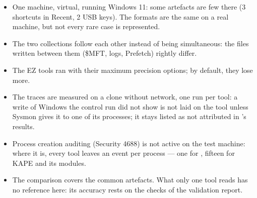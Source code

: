 \documentclass[11pt,a4paper,oneside]{report}
\begin{document}
\begin{itemize}
  \item One machine, virtual, running Windows 11: some artefacts are few there
        (3 shortcuts in Recent, 2 USB keys). The formats are the same on a real
        machine, but not every rare case is represented.
  \item The two collections follow each other instead of being simultaneous: the
        files written between them (\$MFT, logs, Prefetch) rightly differ.
  \item The EZ tools ran with their maximum precision options; by default, they
        lose more.
  \item The traces are measured on a clone without network, one run per tool: a
        write of Windows the control run did not show is not laid on the tool
        unless Sysmon gives it to one of its processes; it stays listed as not
        attributed in 's results.
  \item Process creation auditing (Security 4688) is not active on the test
        machine: where it is, every tool leaves an event per process --- one for
        \wac{}, fifteen for KAPE and its modules.
  \item The comparison covers the common artefacts. What only one tool reads has
        no reference here: its accuracy rests on the checks of the validation
        report.
\end{itemize}
\end{document}

